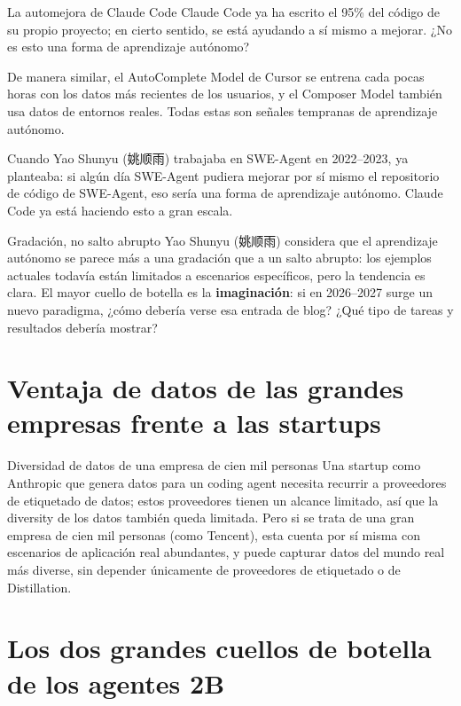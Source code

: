 \documentclass[a4paper]{article}
\begin{document}
\begin{knowledgebox}{La automejora de Claude Code}
Claude Code ya ha escrito el 95\% del código de su propio proyecto; en cierto sentido, se está ayudando a sí mismo a mejorar. ¿No es esto una forma de aprendizaje autónomo?

De manera similar, el AutoComplete Model de Cursor se entrena cada pocas horas con los datos más recientes de los usuarios, y el Composer Model también usa datos de entornos reales. Todas estas son señales tempranas de aprendizaje autónomo.
\end{knowledgebox}

Cuando Yao Shunyu (姚顺雨) trabajaba en SWE-Agent en 2022--2023, ya planteaba: si algún día SWE-Agent pudiera mejorar por sí mismo el repositorio de código de SWE-Agent, eso sería una forma de aprendizaje autónomo. Claude Code ya está haciendo esto a gran escala.

\begin{warningbox}{Gradación, no salto abrupto}
Yao Shunyu (姚顺雨) considera que el aprendizaje autónomo se parece más a una gradación que a un salto abrupto: los ejemplos actuales todavía están limitados a escenarios específicos, pero la tendencia es clara. El mayor cuello de botella es la \textbf{imaginación}: si en 2026--2027 surge un nuevo paradigma, ¿cómo debería verse esa entrada de blog? ¿Qué tipo de tareas y resultados debería mostrar?
\end{warningbox}

\section{Ventaja de datos de las grandes empresas frente a las startups}

\begin{knowledgebox}{Diversidad de datos de una empresa de cien mil personas}
Una startup como Anthropic que genera datos para un coding agent necesita recurrir a proveedores de etiquetado de datos; estos proveedores tienen un alcance limitado, así que la diversity de los datos también queda limitada. Pero si se trata de una gran empresa de cien mil personas (como Tencent), esta cuenta por sí misma con escenarios de aplicación real abundantes, y puede capturar datos del mundo real más diverse, sin depender únicamente de proveedores de etiquetado o de Distillation.
\end{knowledgebox}

\section{Los dos grandes cuellos de botella de los agentes 2B}
\end{document}
